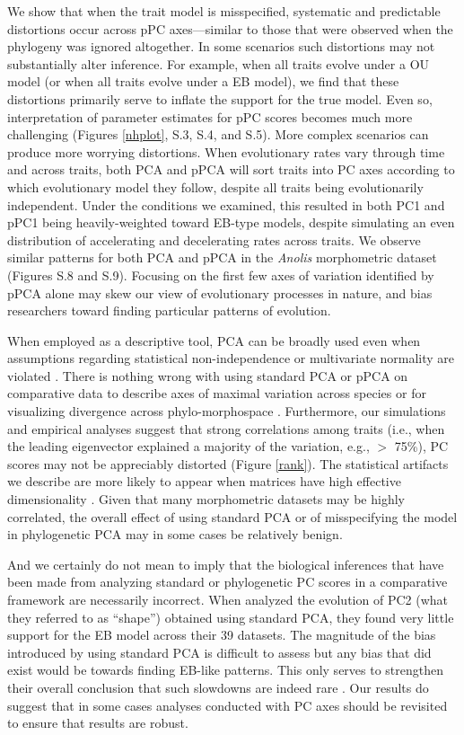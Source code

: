 \documentclass[a4paper,11pt]{article}
\begin{document}
We show that when the trait model is misspecified, systematic and predictable distortions occur across pPC axes---similar to those that were observed when the phylogeny was ignored altogether. In some scenarios such distortions may not substantially alter inference. For example, when all traits evolve under a OU model (or when all traits evolve under a EB model), we find that these distortions primarily serve to inflate the support for the true model. Even so, interpretation of parameter estimates for pPC scores becomes much more challenging (Figures \ref{nhplot}, S.3, S.4, and S.5). More complex scenarios can produce more worrying distortions. When evolutionary rates vary through time and across traits, both PCA and pPCA will sort traits into PC axes according to which evolutionary model they follow, despite all traits being evolutionarily independent. Under the conditions we examined, this resulted in both PC1 and pPC1 being heavily-weighted toward EB-type models, despite simulating an even distribution of accelerating and decelerating rates across traits. We observe similar patterns for both PCA and pPCA in the \textit{Anolis} morphometric dataset (Figures S.8 and S.9). Focusing on the first few axes of variation identified by pPCA alone may skew our view of evolutionary processes in nature, and bias researchers toward finding particular patterns of evolution. 

When employed as a descriptive tool, PCA can be broadly used even when assumptions regarding statistical non-independence or multivariate normality are violated \citep{Jolliffe2002}. There is nothing wrong with using standard PCA or pPCA on comparative data to describe axes of maximal variation across species or for visualizing divergence across phylo-morphospace \citep{Sidlauskas2008}. Furthermore, our simulations and empirical analyses suggest that strong correlations among traits (i.e., when the leading eigenvector explained a majority of the variation, e.g., $>$ 75\%), PC scores may not be appreciably distorted (Figure \ref{rank}). The statistical artifacts we describe are more likely to appear when matrices have high effective dimensionality \citep[see][]{Bookstein2012}. Given that many morphometric datasets may be highly correlated, the overall effect of using standard PCA or of misspecifying the model in phylogenetic PCA may in some cases be relatively benign. 

And we certainly do not mean to imply that the biological inferences that have been made from analyzing standard or phylogenetic PC scores in a comparative framework are necessarily incorrect. When \citet{Harmon2010} analyzed the evolution of PC2 (what they referred to as ``shape'') obtained using standard PCA, they found very little support for the EB model across their 39 datasets. The magnitude of the bias introduced by using standard PCA is difficult to assess but any bias that did exist would be towards finding EB-like patterns. This only serves to strengthen their overall conclusion that such slowdowns are indeed rare \citep[but see][]{SlaterPennell}. Our results do suggest that in some cases analyses conducted with PC axes should be revisited to ensure that results are robust.
\end{document}
